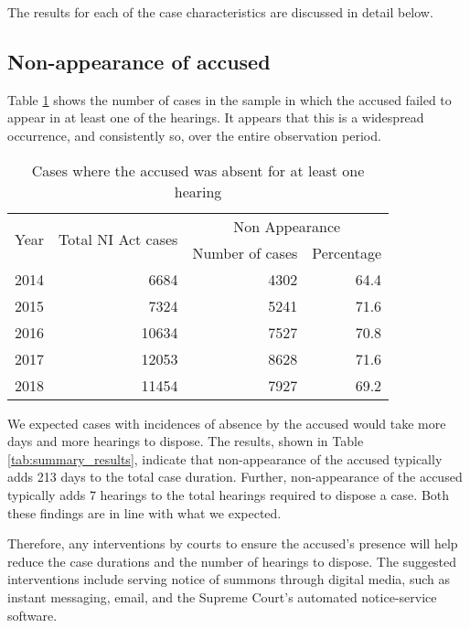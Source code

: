 The results for each of the case characteristics are discussed in detail below.

\subsection{Non-appearance of accused}
\label{sec:non-appe-accus-1}

Table \ref{tab:nonAppearance_yearWise} shows the number of cases in the sample in which the accused failed to appear in at least one of the hearings. It appears that this is a widespread occurrence, and consistently so, over the entire observation period.

\begin{longtable}[h!]{@{}lrrr@{}}
 \caption{Cases where the accused was absent for at least one hearing}\label{tab:nonAppearance_yearWise}\\
\toprule
\multirow{2}{*}{Year} & \multirow{2}{*}{Total NI Act cases} & \multicolumn{2}{c}{Non Appearance}\\
\cmidrule{3-4}
&& Number of cases & Percentage \\
\midrule\endhead
2014 & 6684 & 4302 & 64.4 \\
2015 & 7324 & 5241 & 71.6 \\
2016 & 10634 & 7527 & 70.8 \\
2017 & 12053 & 8628 & 71.6 \\
2018 & 11454 & 7927 & 69.2 \\
\bottomrule
\end{longtable}

We expected cases with incidences of absence by the accused would take more days and more hearings to dispose. The results, shown in Table \ref{tab:summary_results}, indicate that non-appearance of the accused typically adds 213 days to the total case duration. Further, non-appearance of the accused typically adds 7 hearings to the total hearings required to dispose a case. Both these findings are in line with what we expected.

Therefore, any interventions by courts to ensure the accused's presence will help reduce the case durations and the number of hearings to dispose. The suggested interventions include serving notice of summons through digital media, such as instant messaging, email, and the Supreme Court's automated notice-service software.

